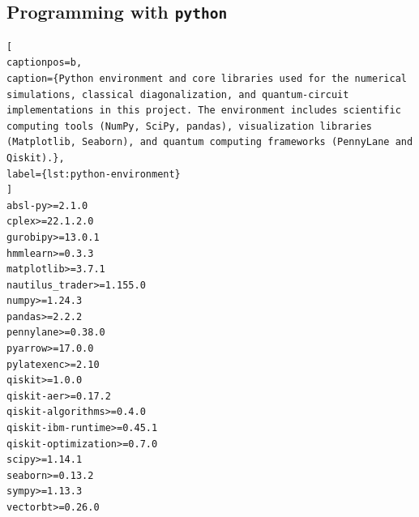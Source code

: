 \subsection{Programming with \texttt{python}}

\begin{lstlisting}[
captionpos=b,
caption={Python environment and core libraries used for the numerical simulations, classical diagonalization, and quantum-circuit implementations in this project. The environment includes scientific computing tools (NumPy, SciPy, pandas), visualization libraries (Matplotlib, Seaborn), and quantum computing frameworks (PennyLane and Qiskit).},
label={lst:python-environment}
]
absl-py>=2.1.0
cplex>=22.1.2.0
gurobipy>=13.0.1
hmmlearn>=0.3.3
matplotlib>=3.7.1
nautilus_trader>=1.155.0
numpy>=1.24.3
pandas>=2.2.2
pennylane>=0.38.0
pyarrow>=17.0.0
pylatexenc>=2.10
qiskit>=1.0.0
qiskit-aer>=0.17.2
qiskit-algorithms>=0.4.0
qiskit-ibm-runtime>=0.45.1
qiskit-optimization>=0.7.0
scipy>=1.14.1
seaborn>=0.13.2
sympy>=1.13.3
vectorbt>=0.26.0
\end{lstlisting}